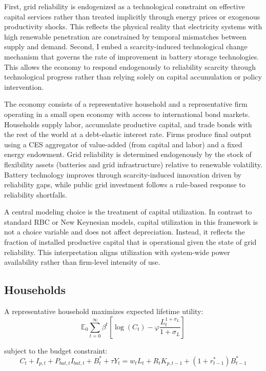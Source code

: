 \documentclass[12pt, a4paper]{article}
\begin{document}
First, grid reliability is endogenized as a technological constraint on effective capital services rather than treated implicitly through energy prices or exogenous productivity shocks. This reflects the physical reality that electricity systems with high renewable penetration are constrained by temporal mismatches between supply and demand. Second, I embed a scarcity-induced technological change mechanism that governs the rate of improvement in battery storage technologies. This allows the economy to respond endogenously to reliability scarcity through technological progress rather than relying solely on capital accumulation or policy intervention.

The economy consists of a representative household and a representative firm operating in a small open economy with access to international bond markets. Households supply labor, accumulate productive capital, and trade bonds with the rest of the world at a debt-elastic interest rate. Firms produce final output using a CES aggregator of value-added (from capital and labor) and a fixed energy endowment. Grid reliability is determined endogenously by the stock of flexibility assets (batteries and grid infrastructure) relative to renewable volatility. Battery technology improves through scarcity-induced innovation driven by reliability gaps, while public grid investment follows a rule-based response to reliability shortfalls.

A central modeling choice is the treatment of capital utilization. In contrast to standard RBC or New Keynesian models, capital utilization in this framework is not a choice variable and does not affect depreciation. Instead, it reflects the fraction of installed productive capital that is operational given the state of grid reliability. This interpretation aligns utilization with system-wide power availability rather than firm-level intensity of use.

\subsection{Households} \label{sec:households}

A representative household maximizes expected lifetime utility:
\begin{equation}
\mathbb{E}_0 \sum_{t=0}^{\infty} \beta^t
\left[
\log(C_t) - \varphi \frac{L_t^{1+\sigma_L}}{1+\sigma_L}
\right]
\label{eq:utility}
\end{equation}

subject to the budget constraint:
\begin{equation}
C_t + I_{p,t} + P_{bat,t} I_{bat,t} + B^*_t + \tau Y_t
=
w_t L_t + R_t K_{p,t-1} + (1+r^*_{t-1}) B^*_{t-1}
\label{eq:hh_budget}
\end{equation}
\end{document}
